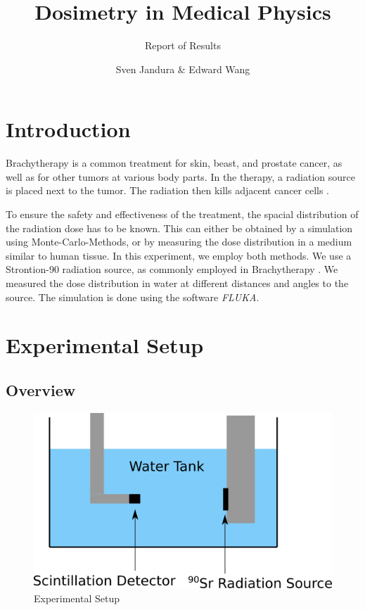 \documentclass[a4paper,parskip]{scrartcl}
\author{Sven Jandura \& Edward Wang}
\title{Dosimetry in Medical Physics}
\subtitle{Report of Results}
\begin{document}
\maketitle

\tableofcontents

\section{Introduction}

Brachytherapy is a common treatment for skin, beast, and prostate cancer, as well as for other tumors at various body parts. In the therapy, a radiation source is placed next to the tumor. The radiation then kills adjacent cancer cells \cite{Ref:1}.

To ensure the safety and effectiveness of the treatment, the spacial distribution of the radiation dose has to be known. This can either be obtained by a simulation using Monte-Carlo-Methods, or by measuring the dose distribution in a medium similar to human tissue. In this experiment, we employ both methods. We use a Strontion-90 radiation source, as commonly employed in Brachytherapy \cite{Ref:2}. We measured the dose distribution in water at different distances and angles to the source.  The simulation is done using the software \textit{FLUKA}. 

\section{Experimental Setup}

\subsection{Overview}

\begin{figure}
\centering
\includegraphics[width = 0.7\linewidth]{overviewCut.png}
\caption{Experimental Setup}
\label{Setup}
\end{figure}
\end{document}
